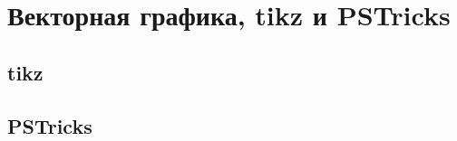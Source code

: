 \section[Векторная графика]{Векторная графика, tikz и  PSTricks}


\subsection{tikz}

	
	

\subsection{PSTricks}	
	
	
		
\pagebreak %
